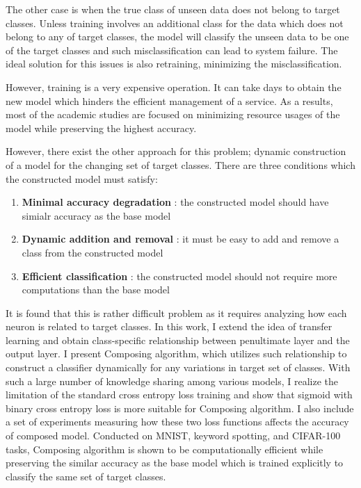 \documentclass{article}
\begin{document}
The other case is when the true class of unseen data does not belong to target classes. Unless training involves an additional class for the data which does not belong to any of target classes, the model will classify the unseen data to be one of the target classes and such misclassification can lead to system failure. The ideal solution for this issues is also retraining, minimizing the misclassification.

However, training is a very expensive operation. It can take days to obtain the new model which hinders the efficient management of a service. As a results, most of the academic studies are focused on minimizing resource usages of the model while preserving the highest accuracy.

However, there exist the other approach for this problem; dynamic construction of a model for the changing set of target classes. There are three conditions which the constructed model must satisfy:

\begin{enumerate}
    \item \textbf{Minimal accuracy degradation} : the constructed model should have simialr accuracy as the base model
    \item \textbf{Dynamic addition and removal} : it must be easy to add and remove a class from the constructed model
    \item \textbf{Efficient classification} : the constructed model should not require more computations than the base model
\end{enumerate}

It is found that this is rather difficult problem as it requires analyzing how each neuron is related to target classes. In this work, I extend the idea of transfer learning and obtain class-specific relationship between penultimate layer and the output layer. I present Composing algorithm, which utilizes such relationship to construct a classifier dynamically for any variations in target set of classes. With such a large number of knowledge sharing among various models, I realize the limitation of the standard cross entropy loss training and show that sigmoid with binary cross entropy loss is more suitable for Composing algorithm. I also include a set of experiments measuring how these two loss functions affects the accuracy of composed model. Conducted on MNIST, keyword spotting, and CIFAR-100 tasks, Composing algorithm is shown to be computationally efficient while preserving the similar accuracy as the base model which is trained explicitly to classify the same set of target classes.
\end{document}
